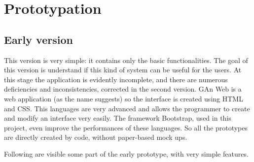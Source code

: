 
\chapter{Prototypation} %

\label{Chapter4} %


\section{Early version}

This version is very simple: it contains only the basic functionalities. The goal of this version is understand if this kind of system can be useful for the users. At this stage the application is evidently incomplete, and there are numerous deficiencies and inconsistencies, corrected in the second version.
GAn Web is a web application (as the name suggests) so the interface is created using HTML and CSS. This languages are very advanced and allows the programmer to create and modify an interface very easily. The framework Bootstrap, used in this project, even improve the performances of these languages. So all the prototypes are directly created by code, without paper-based mock ups.

Following are visible some part of the early prototype, with very simple features.

